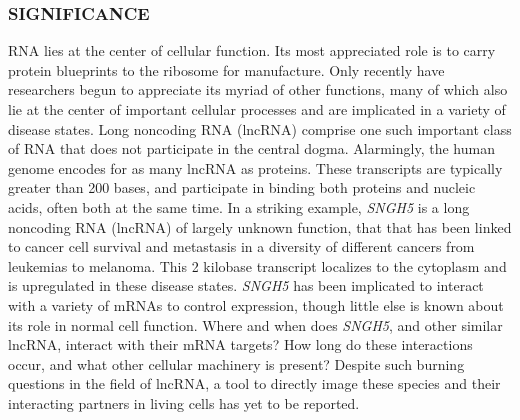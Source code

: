 

\subsubsection*{SIGNIFICANCE}
RNA lies at the center of cellular function. Its most appreciated role is to carry protein blueprints to the ribosome for manufacture.
Only recently have researchers begun to appreciate its myriad of other functions, many of which also lie at the center of important cellular processes and are implicated in a variety of disease states\cite{CechNoncodingRNARevolution2014,DellaRagioneNoncodingRNAschromatin2014,AnastasiadouNoncodingRNAnetworks2018}.
Long noncoding RNA (lncRNA) comprise one such important class of RNA that does not participate in the central dogma\cite{RinnGenomeRegulationLong2012}. Alarmingly, the human genome encodes for as many lncRNA as proteins\cite{Rinntranscriptionalactivityhuman2003,RinnGenomeRegulationLong2012}.
These transcripts are typically greater than 200 bases, and participate in binding both proteins and nucleic acids, often both at the same time\cite{AnastasiadouNoncodingRNAnetworks2018,RinnGenomeRegulationLong2012}.
In a striking example, \textit{SNGH5} is a long noncoding RNA (lncRNA) of largely unknown function, that that has been linked to cancer cell survival and metastasis in a diversity of different cancers from leukemias to melanoma\cite{TanakaRitsukoIntronicU50small2001,DamasSNHG5promotescolorectal2016,ZhaoLongnoncodingRNA2016,HeLncRNASNHG5regulates2017,YanSNHG5promotesproliferation2018,MalncRNASNHG5associated2018,ShenLncRNASNHG5miR26a2018,ZhengLongnoncodingRNA}.
This 2 kilobase transcript localizes to the cytoplasm and is upregulated in these disease states.
\textit{SNGH5} has been implicated to interact with a variety of mRNAs to control expression, though little else is known about its role in normal cell function.
Where and when does \textit{SNGH5}, and other similar lncRNA, interact with their mRNA targets?
How long do these interactions occur, and what other cellular machinery is present?
Despite such burning questions in the field of lncRNA, a tool to directly image these species and their interacting partners in living cells has yet to be reported.

